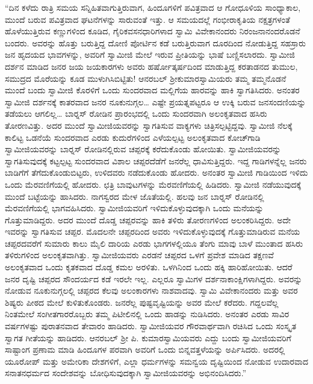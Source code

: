  “ದಿನ ಕಳೆದು ರಾತ್ರಿ ಸಮಯ ಸನ್ನಿಹಿತವಾಗುತ್ತಿರುವಾಗ, ಹಿಂದೂಗಳಿಗೆ ಪವಿತ್ರವಾದ ಆ ಗೋಧೂಳಿಯ ಸಾಂಧ್ಯಾಕಾಲ, ಮುಂದೆ ಬರುವ ಪವಿತ್ರವಾದ ಘಟನೆಗಳನ್ನು ಸಾರುವಂತೆ ಇತ್ತು. ಆ ಸಮಯದಲ್ಲೆ ಗಂಭೀರಾಕೃತಿಯ ನಕ್ಷತ್ರಗಳಂತೆ ಹೊಳೆಯುತ್ತಿರುವ ಕಣ್ಣುಗಳಿಂದ ಕೂಡಿದ, ಗೈರಿಕವಸನಧಾರಿಗಳಾದ ಸ್ವಾಮಿ ವಿವೇಕಾನಂದರು ನಿರಂಜನಾನಂದರೊಡನೆ ಬಂದರು. ಅವರನ್ನು ಹೊತ್ತು ಬರುತ್ತಿದ್ದ ದೋಣಿ ಪೋರ್ಟಿನ ಕಡೆ ಬರುತ್ತಿರುವಾಗ ದೂರದಿಂದ ನೋಡುತ್ತಿದ್ದ ಸಹಸ್ರಾರು ಜನ ಹೃದಯದ ಭಾವಗಳನ್ನು, ಅವರಿಗೆ ಸ್ವಾಮೀಜಿ ಮೇಲೆ ಇರುವ ಪ್ರೀತಿಯನ್ನು ಭಾಷೆ ಬಣ್ಣಿಸಲಾರದು. ಸ್ವಾಮೀಜಿ ದರ್ಶನ ಮಾಡಿದ ಜನರ ಜಯ ಜಯಕಾರಗಳು ಅವರು ಹರ್ಷೋತ್ಕರ್ಷದಿಂದ ಮಾಡುತ್ತಿದ್ದ ಕರತಾಡನದ ತುಮುಲ, ಸಮುದ್ರದ ಮೊರೆಯನ್ನು ಕೂಡ ಮುಳುಗಿಸಿಬಿಟ್ಟಿತು! ಆನರಬಲ್ ಶ‍್ರೀಕುಮಾರಸ್ವಾಮಿಯರು ತಮ್ಮ ತಮ್ಮನೊಡನೆ ಮುಂದೆ ಬಂದು ಸ್ವಾಮೀಜಿ ಕೊರಳಿಗೆ ಒಂದು ಸುಂದರವಾದ ಮಲ್ಲಿಗೆಯ ಹಾರವನ್ನು ಹಾಕಿ ಸ್ವಾಗತಿಸಿದರು. ಅನಂತರ ಸ್ವಾಮೀಜಿ ದರ್ಶನಕ್ಕೆ ಕಾತರವಾದ ಜನರ ನೂಕುನುಗ್ಗಲ… ಎಷ್ಟೇ ಪ್ರಯತ್ನಪಟ್ಟರೂ ಆ ಉಕ್ಕಿ ಬರುವ ಜನಸಂದಣಿಯನ್ನು ತಡೆಯಲು ಆಗಲಿಲ್ಲ… ಬಾರ್‍ನಸ್ ರೋಡಿನ ಪ್ರಾರಂಭದಲ್ಲಿ ಒಂದು ಸುಂದರವಾಗಿ ಅಲಂಕೃತವಾದ ಹಸಿರು ತೋರಣವಿತ್ತು. ಅದರ ಮುಂದೆ ಸ್ವಾಮೀಜಿಯವರನ್ನು ಸ್ವಾಗತಿಸುವ ವಾಕ್ಯಗಳು ಚಿತ್ರಿಸಲ್ಪಟ್ಟಿದ್ದವು. ಸ್ವಾಮೀಜಿ ನೆಲಕ್ಕೆ ಕಾಲಿಟ್ಟ ಒಡನೆಯೆ ಸುಂದರವಾದ ಎರಡು ಕುದುರೆಗಳಿಂದ ಎಳೆಯಲ್ಪಟ್ಟ ಅಲಂಕೃತವಾದ ಕೋಚ್‍ಗಾಡಿ ಸ್ವಾಮೀಜಿಯವರನ್ನು ಬಾರ್‍ನಸ್ ರೋಡಿನಲ್ಲಿರುವ ಚಪ್ಪರಕ್ಕೆ ಕರೆದುಕೊಂಡು ಹೋಯಿತು. ಸ್ವಾಮೀಜಿಯವರನ್ನು ಸ್ವಾಗತಿಸುವುದಕ್ಕೆ ಕಟ್ಟಲ್ಪಟ್ಟ ಸುಂದರವಾದ ವಿಶಾಲ ಚಪ್ಪರದೆಡೆಗೆ ಜನರೆಲ್ಲ ಧಾವಿಸುತ್ತಿದ್ದರು. ಇದ್ದ ಗಾಡಿಗಳನ್ನೆಲ್ಲ ಜನರು ಬಾಡಿಗೆಗೆ ತೆಗೆದುಕೊಂಡುಬಿಟ್ಟರು, ಉಳಿದವರು ನಡೆದುಕೊಂಡು ಹೋದರು. ಅನಂತರ ಸ್ವಾಮೀಜಿ ಗಾಡಿಯಿಂದ ಇಳಿದು ಒಂದು ಮೆರವಣಿಗೆಯಲ್ಲಿ ಹೋದರು. ಛತ್ರಿ ಬಾವುಟಗಳನ್ನು ಮೆರವಣಿಗೆಯಲ್ಲಿ ಹಿಡಿದರು. ಸ್ವಾಮೀಜಿ ನಡೆಯುವುದಕ್ಕೆ ಮುಂದೆ ಬಟ್ಟೆಯನ್ನು ಹಾಸಿದರು. ನಾಗಸ್ವರದ ಮೇಳ ಜೊತೆಯಲ್ಲಿ. ಹಲವು ಜನ ಬಾರ್‍ನಸ್ ರೋಡಿನಲ್ಲಿ ಮೆರವಣಿಗೆಯಲ್ಲಿ ಭಾಗವಹಿಸಿದರು. ಸ್ವಾಮೀಜಿಯವರಿಗೆ ಇಳಿದುಕೊಳ್ಳುವುದಕ್ಕಾಗಿ ಒಂದು ಮನೆಯನ್ನು ಗೊತ್ತುಮಾಡಿದ್ದರು. ಅದರ ಮುಂದೆ ದೊಡ್ಡ ಚಪ್ಪರವನ್ನು ಹಾಕಿ ತಳಿರು ತೋರಣಗಳಿಂದ ಅಲಂಕರಿಸಿದ್ದರು. ಅದೇ ಇವರನ್ನು ಸ್ವಾಗತಿಸುವ ಚಪ್ಪರ. ಮೊದಲನೇ ಚಪ್ಪರದಿಂದ ಅವರು ಇಳಿದುಕೊಳ್ಳುವುದಕ್ಕೆ ಗೊತ್ತುಮಾಡಿರುವ ಮನೆಯ ಚಪ್ಪರದವರೆಗೆ ಸುಮಾರು ಕಾಲು ಮೈಲಿ ದಾರಿಯ ಎರಡು ಭಾಗಗಳಲ್ಲಿಯೂ ತೆಂಗು ಮಾವು ಬಾಳೆ ಮುಂತಾದ ಹಸಿರು ತಳಿರುಗಳಿಂದ ಅಲಂಕೃತವಾಗಿತ್ತು. ಸ್ವಾಮೀಜಿಯವರು ಎರಡನೆ ಚಪ್ಪರದ ಒಳಗೆ ಪ್ರವೇಶ ಮಾಡಿದ ತಕ್ಷಣವೆ ಅಲಂಕೃತವಾದ ಒಂದು ಕೃತಕವಾದ ದೊಡ್ಡ ಕಮಲ ಅರಳಿತು. ಒಳಗಿನಿಂದ ಒಂದು ಹಕ್ಕಿ ಹಾರಿಹೋಯಿತು. ಆದರೆ ಜನರ ದೃಷ್ಟಿ ಚಪ್ಪರದ ಸೌಂದರ್ಯದ ಕಡೆ ಇರಲೇ ಇಲ್ಲ. ಎಲ್ಲರೂ ಸ್ವಾಮಿಗಳ ದರ್ಶನಾಕಾಂಕ್ಷಿಗಳಾಗಿದ್ದರು. ಅವರನ್ನು ನೋಡುವ ನೂಕುನುಗ್ಗಲಲ್ಲಿ ಚಪ್ಪರದ ಕೆಲವು ಅಲಂಕಾರಗಳು ನಾಶವಾದವು. ಸ್ವಾಮಿ ವಿವೇಕಾನಂದರು ಮತ್ತು ಅವರ ಶಿಷ್ಯರು ಪೀಠದ ಮೇಲೆ ಕುಳಿತುಕೊಂಡರು. ಜನರೆಲ್ಲ ಪುಷ್ಟವೃಷ್ಟಿಯನ್ನು ಅವರ ಮೇಲೆ ಕರೆದರು. ಗದ್ದಲವೆಲ್ಲ ನಿಂತಮೇಲೆ ಸಂಗೀತಗಾರರೊಬ್ಬರು ತಮ್ಮ ಪಿಟೀಲಿನಲ್ಲಿ ಒಂದು ಹಾಡನ್ನು ನುಡಿಸಿದರು. ಅನಂತರ ಎರಡು ಸಾವಿರ ವರ್ಷಗಳಷ್ಟು ಪುರಾತನವಾದ ತೇವಾರಂ ಹಾಡಿದರು. ಸ್ವಾಮೀಜಿಯವರ ಗೌರವಾರ್ಥವಾಗಿ ರಚಿಸಿದ ಒಂದು ಸಂಸ್ಕೃತ ಸ್ವಾಗತ ಗೀತೆಯನ್ನು ಹಾಡಿದರು. ಆನರಬಲ್ ಶ‍್ರೀ ಪಿ. ಕುಮಾರಸ್ವಾಮಿಯವರು ಎದ್ದು ಬಂದು ಸ್ವಾಮೀಜಿಯವರಿಗೆ ಸಾಷ್ಟಾಂಗ ಪ್ರಣಾಮ ಮಾಡಿ ಹಿಂದೂಗಳ ಪರವಾಗಿ ಅವರಿಗೆ ಒಂದು ಬಿನ್ನವತ್ತಳೆಯನ್ನು ಅರ್ಪಿಸಿದರು. ಅದರಲ್ಲಿ ಯೂರೋಪ್ ಮತ್ತು ಅಮೇರಿಕಾ ದೇಶಗಳಿಗೆ, ಎಲ್ಲಾ ಧರ್ಮಗಳನ್ನು ಸಮನ್ವಯ ದೃಷ್ಟಿಯಿಂದ ನೋಡುವ ಉದಾರವಾದ ಸನಾತನಧರ್ಮದ ಸಂದೇಶವನ್ನು ಬೋಧಿಸುವುದಕ್ಕಾಗಿ ಸ್ವಾಮೀಜಿಯವರನ್ನು ಅಭಿನಂದಿಸಿದರು.” 


